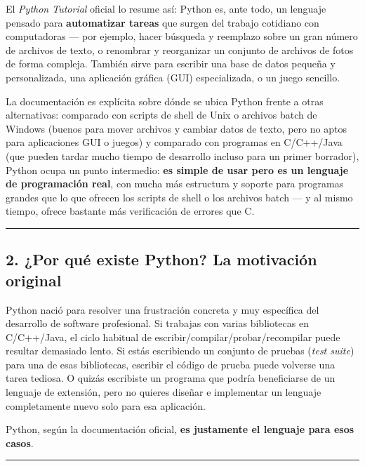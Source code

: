 \documentclass[
  doc,
  floatsintext,
  longtable,
  a4paper,
  nolmodern,
  notxfonts,
  notimes,
  12pt,
  colorlinks=true,linkcolor=blue,citecolor=blue,urlcolor=blue]{apa7}
\begin{document}
El \emph{Python Tutorial} oficial lo resume así: Python es, ante todo,
un lenguaje pensado para \textbf{automatizar tareas} que surgen del
trabajo cotidiano con computadoras --- por ejemplo, hacer búsqueda y
reemplazo sobre un gran número de archivos de texto, o renombrar y
reorganizar un conjunto de archivos de fotos de forma compleja. También
sirve para escribir una base de datos pequeña y personalizada, una
aplicación gráfica (GUI) especializada, o un juego sencillo.

La documentación es explícita sobre dónde se ubica Python frente a otras
alternativas: comparado con scripts de shell de Unix o archivos batch de
Windows (buenos para mover archivos y cambiar datos de texto, pero no
aptos para aplicaciones GUI o juegos) y comparado con programas en
C/C++/Java (que pueden tardar mucho tiempo de desarrollo incluso para un
primer borrador), Python ocupa un punto intermedio: \textbf{es simple de
usar pero es un lenguaje de programación real}, con mucha más estructura
y soporte para programas grandes que lo que ofrecen los scripts de shell
o los archivos batch --- y al mismo tiempo, ofrece bastante más
verificación de errores que C.

\begin{center}\rule{0.5\linewidth}{0.5pt}\end{center}

\subsection{2. ¿Por qué existe Python? La motivación
original}\label{por-quuxe9-existe-python-la-motivaciuxf3n-original}

Python nació para resolver una frustración concreta y muy específica del
desarrollo de software profesional. Si trabajas con varias bibliotecas
en C/C++/Java, el ciclo habitual de escribir/compilar/probar/recompilar
puede resultar demasiado lento. Si estás escribiendo un conjunto de
pruebas (\emph{test suite}) para una de esas bibliotecas, escribir el
código de prueba puede volverse una tarea tediosa. O quizás escribiste
un programa que podría beneficiarse de un lenguaje de extensión, pero no
quieres diseñar e implementar un lenguaje completamente nuevo solo para
esa aplicación.

Python, según la documentación oficial, \textbf{es justamente el
lenguaje para esos casos}.

\begin{center}\rule{0.5\linewidth}{0.5pt}\end{center}
\end{document}
